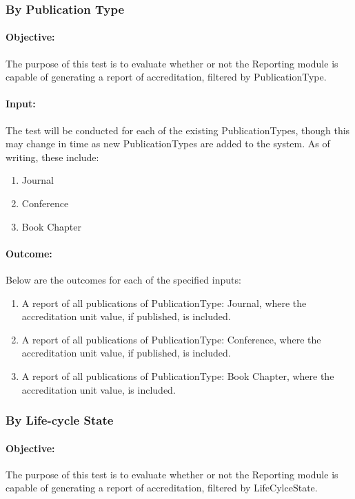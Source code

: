 \subsubsection{By Publication Type} \label{ti_ar_pubtype}
\paragraph{Objective:}
The purpose of this test is to evaluate whether or not the Reporting module is capable of 
generating a report of accreditation, filtered by PublicationType.
\paragraph{Input:}
The test will be conducted for each of the existing PublicationTypes, though this may change in time as new PublicationTypes are added to the system. As of writing, these include:
\begin{enumerate}
	\item Journal
	\item Conference
	\item Book Chapter
\end{enumerate}
\paragraph{Outcome:}
Below are the outcomes for each of the specified inputs:
\begin{enumerate}
	\item A report of all publications of PublicationType: Journal, where the accreditation unit value, if published, is included.
	\item A report of all publications of PublicationType: Conference, where the accreditation unit value, if published, is included.
	\item A report of all publications of PublicationType: Book Chapter, where the accreditation unit value, is included.
\end{enumerate}

\subsubsection{By Life-cycle State} \label{ti_ar_lcs}
\paragraph{Objective:}
The purpose of this test is to evaluate whether or not the Reporting module is capable of 
generating a report of accreditation, filtered by LifeCylceState.
